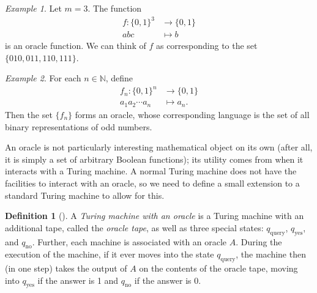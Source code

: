 \documentclass[english]{reedthesis}
\theoremstyle{plain}
\theoremstyle{definition}
\newtheorem{defn}[defn]{Definition}
\theoremstyle{remark}
\newtheorem{example}{Example}[thm]
\begin{document}
\begin{example}\label{ex:oracle-function}
  Let $m = 3$. The function
  \begin{equation}
    \begin{aligned}
      f: \{0, 1\}^{3} &\rightarrow \{0, 1\} \\
      abc &\mapsto b
    \end{aligned}
  \end{equation}
  is an oracle function. We can think of $f$ as corresponding to the set
  $\{010, 011, 110, 111\}$.
\end{example}

\begin{example}\label{ex:oracle-full}
  For each $n \in \mathbb{N}$, define
  \begin{equation}
    \begin{aligned}
      f_{n}: \{0, 1\}^{n} &\rightarrow \{0, 1\} \\
      a_{1}a_{2} \cdots a_{n} &\mapsto a_{n}.
    \end{aligned}
  \end{equation}
  Then the set $\{f_{n}\}$ forms an oracle, whose corresponding language is the
  set of all binary representations of odd numbers.
\end{example}


An oracle is not particularly interesting mathematical object on its own (after
all, it is simply a set of arbitrary Boolean functions); its utility comes from
when it interacts with a Turing machine. A normal Turing machine does not have
the facilities to interact with an oracle, so we need to define a small
extension to a standard Turing machine to allow for this.

\begin{defn}[{\cite[Def.\ 3.6]{AB09}}]\label{def:tm-oracle}
  A \emph{Turing machine with an oracle} is a Turing machine with an additional
  tape, called the \emph{oracle tape}, as well as three special states:
  $q_{\text{query}}$, $q_{\text{yes}}$, and $q_{\text{no}}$. Further, each
  machine is associated with an oracle $A$. During the execution of the machine,
  if it ever moves into the state $q_{\text{query}}$, the machine then (in one
  step) takes the output of $A$ on the contents of the oracle tape, moving into
  $q_{\text{yes}}$ if the answer is 1 and $q_{\text{no}}$ if the answer is 0.
\end{defn}
\end{document}
